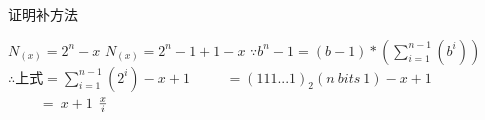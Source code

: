 证明补方法

$N_{(x)} = 2^n - x$
$N_{(x)} = 2^n-1+1-x$
$\because b^n-1=(b-1)*(\sum_{i=1}^{n-1}(b^i))$
$\therefore 上式 = \sum_{i=1}^{n-1}(2^i)-x+1$
$\ \ \ \ \ \ \ \ \ \ =(111...1)_2(n\ bits\ 1)-x+1$
$\ \ \ \ \ \ \ \ \ \ =~x+1$
$x \over i$
